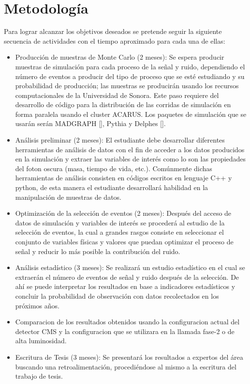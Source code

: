 \chapter{Metodología}
Para lograr alcanzar los objetivos deseados se pretende seguir la siguiente secuencia de actividades con el tiempo aproximado para cada una de ellas:
\begin{itemize}
    \item Producción de muestras de Monte Carlo (2 meses): Se espera producir muestras de simulación para cada proceso de la señal y ruido, dependiendo el número de eventos a producir del tipo de proceso que se esté estudiando y su probabilidad de producción; las muestras se producirán usando los recursos computacionales de la Universidad de Sonora. Este paso requiere del desarrollo de código para la distribución de las corridas de simulación en forma paralela usando el cluster ACARUS. Los paquetes de simulación que se usarán serán MADGRAPH [], Pythia y Delphes [].
    \item Análisis preliminar (2 meses): El estudiante debe desarrollar diferentes herramientas de análisis de datos con el fin de acceder a los datos producidos en la simulación y extraer las variables de interés como lo son las propiedades del foton oscura (masa, tiempo de vida, etc.). Comúnmente dichas herramientas de análisis consisten en códigos escritos en lenguaje C++ y python, de esta manera el estudiante desarrollará habilidad en la manipulación de muestras de datos.
    \item Optimización de la selección de eventos (2 meses): Después del acceso de datos de simulación y variables de interés se procederá al estudio de la selección de eventos, la cual a grandes rasgos consiste en seleccionar el conjunto de variables físicas y valores que puedan optimizar el proceso de señal y reducir lo más posible la contribución del ruido.
    \item Análisis estadístico (3 meses): Se realizará un estudio estadístico en el cual se extraerán el número de eventos de señal y ruido después de la selección. De ahí se puede interpretar los resultados en base a indicadores estadísticos y concluir la probabilidad de observación con datos recolectados en los próximos años.
    \item Comparacion de los resultados obtenidos usando la configuracion actual del detector CMS y la configuracion que se utilizara en la llamada fase-2 o de alta luminosidad. 
    \item Escritura de Tesis (3 meses): Se presentará los resultados a expertos del área buscando una retroalimentación, procediéndose al mismo a la escritura del trabajo de tesis.
\end{itemize}
